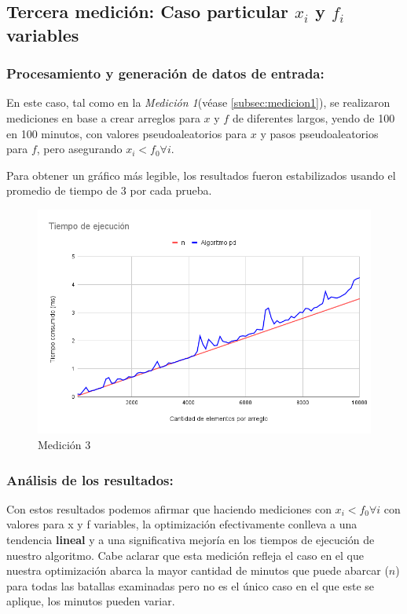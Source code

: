 \newpage

\subsection{Tercera medición: Caso particular $x_i$ y $f_i$ variables}

\subsubsection{Procesamiento y generación de datos de entrada:} 
En este caso, tal como en la \textit{Medición 1}(véase \ref{subsec:medicion1}), se realizaron mediciones en base a crear arreglos para $x$ y $f$ de diferentes largos, yendo de 100 en 100 minutos, con valores pseudoaleatorios para $x$ y pasos pseudoaleatorios para $f$, pero asegurando $x_i < f_0 \forall i $.

Para obtener un gráfico más legible, los resultados fueron estabilizados usando el promedio de tiempo de 3 por cada prueba.

\begin{figure}[H]
    \centering
    \includegraphics[width=1\textwidth]{img/tiempos_10k_100_xi_f0_no_constantes.png}
    \caption{Medición 3}
\end{figure}

\subsubsection{Análisis de los resultados:}
Con estos resultados podemos afirmar que haciendo mediciones con $x_i < f_0 \forall i $ con valores para x y f variables, la optimización efectivamente conlleva a una tendencia \textbf{lineal} y a una significativa mejoría en los tiempos de ejecución de nuestro algoritmo. Cabe aclarar que esta medición refleja el caso en el que nuestra optimización abarca la mayor cantidad de minutos que puede abarcar ($n$) para todas las batallas examinadas pero no es el único caso en el que este se aplique, los minutos pueden variar.
\newpage
